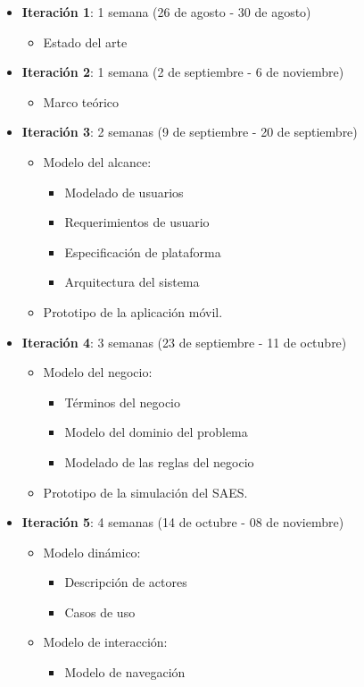 	\begin{itemize}
		\item \textbf{Iteración 1}: 1 semana (26 de agosto - 30 de agosto)
		\begin{itemize}
			\item Estado del arte 
		\end{itemize}
		
		\item \textbf{Iteración 2}: 1 semana (2 de septiembre - 6 de noviembre)
		\begin{itemize}
			\item Marco teórico 
		\end{itemize}
		
		\item \textbf{Iteración 3}: 2 semanas (9 de septiembre - 20 de septiembre)
		\begin{itemize}
			\item Modelo del alcance:
			\begin{itemize}
				\item Modelado de usuarios
				\item Requerimientos de usuario
				\item Especificación de plataforma
				\item Arquitectura del sistema
			\end{itemize}
			\item Prototipo de la aplicación móvil.
		\end{itemize}
		
		\item \textbf{Iteración 4}: 3 semanas (23 de septiembre - 11 de octubre)
		\begin{itemize}
			\item Modelo del negocio:
			\begin{itemize}
				\item Términos del negocio
				\item Modelo del dominio del problema
				\item Modelado de las reglas del negocio
			\end{itemize}
			\item Prototipo de la simulación del SAES.
		\end{itemize}
		
		\item \textbf{Iteración 5}: 4 semanas (14 de octubre -  08 de noviembre)
		\begin{itemize}
			\item Modelo dinámico:
			\begin{itemize}
				\item Descripción de actores
				\item Casos de uso
			\end{itemize}
			\item Modelo de interacción:
			\begin{itemize}
				\item Modelo de navegación
			\end{itemize}


\end{itemize}
\end{itemize}
